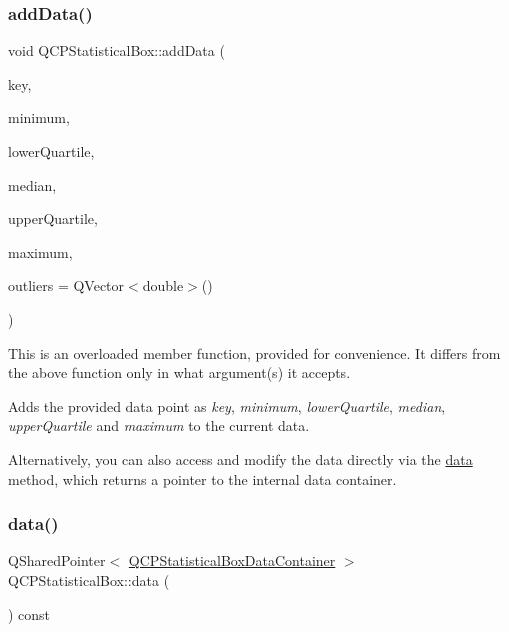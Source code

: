 \subsubsection{\texorpdfstring{addData()}{addData()}\hspace{0.1cm}{\footnotesize\ttfamily [2/2]}}
{\footnotesize\ttfamily void Q\+C\+P\+Statistical\+Box\+::add\+Data (\begin{DoxyParamCaption}\item[{double}]{key,  }\item[{double}]{minimum,  }\item[{double}]{lower\+Quartile,  }\item[{double}]{median,  }\item[{double}]{upper\+Quartile,  }\item[{double}]{maximum,  }\item[{const Q\+Vector$<$ double $>$ \&}]{outliers = {\ttfamily QVector$<$double$>$()} }\end{DoxyParamCaption})}

This is an overloaded member function, provided for convenience. It differs from the above function only in what argument(s) it accepts.

Adds the provided data point as {\itshape key}, {\itshape minimum}, {\itshape lower\+Quartile}, {\itshape median}, {\itshape upper\+Quartile} and {\itshape maximum} to the current data.

Alternatively, you can also access and modify the data directly via the \mbox{\hyperlink{class_q_c_p_statistical_box_a728e501413eaf191544014173d52dfbc}{data}} method, which returns a pointer to the internal data container. \mbox{\label{class_q_c_p_statistical_box_a728e501413eaf191544014173d52dfbc}} 
\subsubsection{\texorpdfstring{data()}{data()}}
{\footnotesize\ttfamily Q\+Shared\+Pointer$<$ \mbox{\hyperlink{qcustomplot_8h_a8b773c0c35f8f924701ced6e9915e4c7}{Q\+C\+P\+Statistical\+Box\+Data\+Container}} $>$ Q\+C\+P\+Statistical\+Box\+::data (\begin{DoxyParamCaption}{ }\end{DoxyParamCaption}) const\hspace{0.3cm}{\ttfamily [inline]}}


